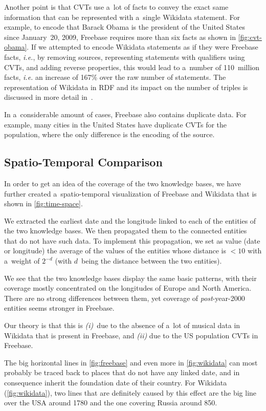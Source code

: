 \documentclass{sig-alternate-2013}
\begin{document}
Another point is that CVTs use a~lot of facts to convey the exact same information
that can be represented with a~single Wikidata statement.
For example, to encode that Barack Obama is the president
of the United States since January~20, 2009,
Freebase requires more than six facts as shown in \autoref{fig:cvt-obama}.
If we attempted to encode Wikidata statements as if they were Freebase facts, \emph{i.e.},
by removing sources, representing statements with qualifiers using CVTs,
and adding reverse properties, this would lead to a~number of 110~million facts,
\emph{i.e.} an increase of 167\% over the raw number of statements.
The representation of Wikidata in RDF and its impact on the number of triples
is discussed in more detail in~\cite{reification-wikidata}.

In a~considerable amount of cases, Freebase also contains duplicate data.
For example, many cities in the United States have duplicate CVTs for the population,
where the only difference is the encoding of the source.

\subsection{Spatio-Temporal Comparison}

In order to get an idea of the coverage of the two knowledge bases,
we have further created a~spatio-temporal visualization of Freebase and Wikidata
that is shown in \autoref{fig:time-space}.

We extracted the earliest date and the longitude
linked to each of the entities of the two knowledge bases.
We then propagated them to the connected entities that do not have such data.
To implement this propagation, we set as value (date or longitude)
the average of the values of the entities whose distance is $<10$
with a~weight of $2^{-d}$ (with $d$~being the distance between the two entities).

We see that the two knowledge bases display the same basic patterns,
with their coverage mostly concentrated on the longitudes of Europe and North America.
There are no strong differences between them,
yet coverage of \mbox{\emph{post}-year-2000} entities seems stronger in Freebase.

Our theory is that this is
\emph{(i)}~due to the absence of a~lot of musical data in Wikidata that is present in Freebase,
and \emph{(ii)} due to the US population CVTs in Freebase.

The big horizontal lines in \autoref{fig:freebase} and even more in \autoref{fig:wikidata}
can most probably be traced back to places that do not have any linked date,
and in consequence inherit the foundation date of their country.
For Wikidata (\autoref{fig:wikidata}), two lines that are definitely caused by this effect
are the big line over the USA around 1780
and the one covering Russia around 850.
\end{document}
